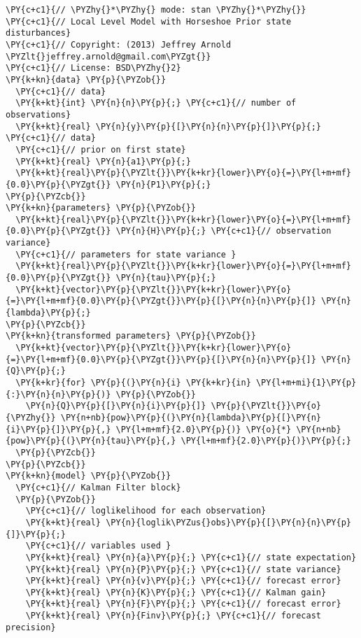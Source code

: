 \begin{Verbatim}[commandchars=\\\{\}]
\PY{c+c1}{// \PYZhy{}*\PYZhy{} mode: stan \PYZhy{}*\PYZhy{}}
\PY{c+c1}{// Local Level Model with Horseshoe Prior state disturbances}
\PY{c+c1}{// Copyright: (2013) Jeffrey Arnold \PYZlt{}jeffrey.arnold@gmail.com\PYZgt{}}
\PY{c+c1}{// License: BSD\PYZhy{}2}
\PY{k+kn}{data} \PY{p}{\PYZob{}}
  \PY{c+c1}{// data}
  \PY{k+kt}{int} \PY{n}{n}\PY{p}{;} \PY{c+c1}{// number of observations}
  \PY{k+kt}{real} \PY{n}{y}\PY{p}{[}\PY{n}{n}\PY{p}{]}\PY{p}{;} \PY{c+c1}{// data}
  \PY{c+c1}{// prior on first state}
  \PY{k+kt}{real} \PY{n}{a1}\PY{p}{;}
  \PY{k+kt}{real}\PY{p}{\PYZlt{}}\PY{k+kr}{lower}\PY{o}{=}\PY{l+m+mf}{0.0}\PY{p}{\PYZgt{}} \PY{n}{P1}\PY{p}{;}
\PY{p}{\PYZcb{}}
\PY{k+kn}{parameters} \PY{p}{\PYZob{}}
  \PY{k+kt}{real}\PY{p}{\PYZlt{}}\PY{k+kr}{lower}\PY{o}{=}\PY{l+m+mf}{0.0}\PY{p}{\PYZgt{}} \PY{n}{H}\PY{p}{;} \PY{c+c1}{// observation variance}
  \PY{c+c1}{// parameters for state variance }
  \PY{k+kt}{real}\PY{p}{\PYZlt{}}\PY{k+kr}{lower}\PY{o}{=}\PY{l+m+mf}{0.0}\PY{p}{\PYZgt{}} \PY{n}{tau}\PY{p}{;} 
  \PY{k+kt}{vector}\PY{p}{\PYZlt{}}\PY{k+kr}{lower}\PY{o}{=}\PY{l+m+mf}{0.0}\PY{p}{\PYZgt{}}\PY{p}{[}\PY{n}{n}\PY{p}{]} \PY{n}{lambda}\PY{p}{;}
\PY{p}{\PYZcb{}}
\PY{k+kn}{transformed parameters} \PY{p}{\PYZob{}}
  \PY{k+kt}{vector}\PY{p}{\PYZlt{}}\PY{k+kr}{lower}\PY{o}{=}\PY{l+m+mf}{0.0}\PY{p}{\PYZgt{}}\PY{p}{[}\PY{n}{n}\PY{p}{]} \PY{n}{Q}\PY{p}{;}
  \PY{k+kr}{for} \PY{p}{(}\PY{n}{i} \PY{k+kr}{in} \PY{l+m+mi}{1}\PY{p}{:}\PY{n}{n}\PY{p}{)} \PY{p}{\PYZob{}}
    \PY{n}{Q}\PY{p}{[}\PY{n}{i}\PY{p}{]} \PY{p}{\PYZlt{}}\PY{o}{\PYZhy{}} \PY{n+nb}{pow}\PY{p}{(}\PY{n}{lambda}\PY{p}{[}\PY{n}{i}\PY{p}{]}\PY{p}{,} \PY{l+m+mf}{2.0}\PY{p}{)} \PY{o}{*} \PY{n+nb}{pow}\PY{p}{(}\PY{n}{tau}\PY{p}{,} \PY{l+m+mf}{2.0}\PY{p}{)}\PY{p}{;}
  \PY{p}{\PYZcb{}}
\PY{p}{\PYZcb{}}
\PY{k+kn}{model} \PY{p}{\PYZob{}}
  \PY{c+c1}{// Kalman Filter block}
  \PY{p}{\PYZob{}}
    \PY{c+c1}{// loglikelihood for each observation}
    \PY{k+kt}{real} \PY{n}{loglik\PYZus{}obs}\PY{p}{[}\PY{n}{n}\PY{p}{]}\PY{p}{;}
    \PY{c+c1}{// variables used }
    \PY{k+kt}{real} \PY{n}{a}\PY{p}{;} \PY{c+c1}{// state expectation}
    \PY{k+kt}{real} \PY{n}{P}\PY{p}{;} \PY{c+c1}{// state variance}
    \PY{k+kt}{real} \PY{n}{v}\PY{p}{;} \PY{c+c1}{// forecast error}
    \PY{k+kt}{real} \PY{n}{K}\PY{p}{;} \PY{c+c1}{// Kalman gain}
    \PY{k+kt}{real} \PY{n}{F}\PY{p}{;} \PY{c+c1}{// forecast error}
    \PY{k+kt}{real} \PY{n}{Finv}\PY{p}{;} \PY{c+c1}{// forecast precision}
    

\end{Verbatim}
